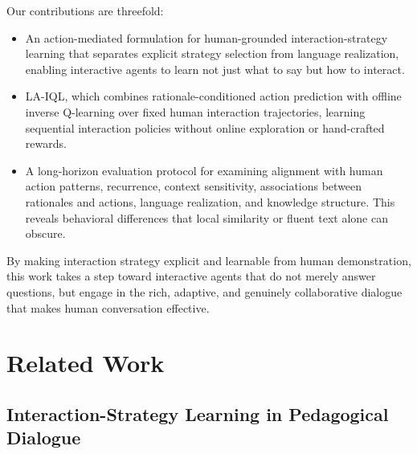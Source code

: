 \documentclass[manuscript,review,anonymous]{acmart}
\begin{document}
Our contributions are threefold:
\begin{itemize}[leftmargin=*,itemsep=1pt,topsep=2pt]
    \item An action-mediated formulation for human-grounded
    interaction-strategy learning that separates explicit strategy selection
    from language realization, enabling interactive agents to learn not just
    what to say but how to interact.
    \item LA-IQL, which combines rationale-conditioned action prediction with
    offline inverse Q-learning over fixed human interaction trajectories,
    learning sequential interaction policies without online exploration or
    hand-crafted rewards.
    \item A long-horizon evaluation protocol for examining alignment with human
    action patterns, recurrence, context sensitivity, associations between
    rationales and actions, language realization, and knowledge structure. This
    reveals behavioral differences that local similarity or fluent text alone
    can obscure.
\end{itemize}

By making interaction strategy explicit and learnable from human
demonstration, this work takes a step toward interactive agents that do not
merely answer questions, but engage in the rich, adaptive, and genuinely
collaborative dialogue that makes human conversation effective.

\section{Related Work}

\subsection{Interaction-Strategy Learning in Pedagogical Dialogue}
\end{document}
